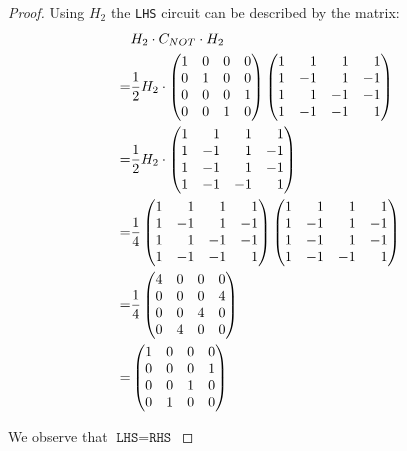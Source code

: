 \begin{proof}
\noindent Using $H_2$ the \texttt{LHS} circuit can be described by the matrix:
\begin{align*}
    &H_2 \cdot C_{NOT} \cdot H_2\\
    =& \frac{1}{2} H_2 \cdot  \begin{pmatrix*}[r] 1&0&0&0 \\ 0&1&0&0 \\ 0&0&0&1\\0&0&1&0 \end{pmatrix*}\hmantwo\\
    =&\frac{1}{2} H_2 \cdot \begin{pmatrix*}[r] 1&1&1&1 \\ 1&-1&1&-1 \\ 1&-1&1&-1\\1&-1&-1&1 \end{pmatrix*}\\
    =&\frac{1}{4} \hmantwo \begin{pmatrix*}[r] 1&1&1&1 \\ 1&-1&1&-1 \\ 1&-1&1&-1\\1&-1&-1&1 \end{pmatrix*}\\
    =&\frac{1}{4} \begin{pmatrix*}[r] 4&0&0&0 \\ 0&0&0&4 \\ 0&0&4&0\\0&4&0&0 \end{pmatrix*}\\
    =&\begin{pmatrix*}[r] 1&0&0&0 \\ 0&0&0&1 \\ 0&0&1&0\\0&1&0&0 \end{pmatrix*}
\end{align*}

\noindent We observe that $\texttt{LHS}=\texttt{RHS}$
\end{proof}